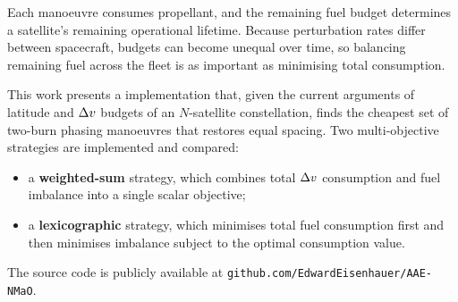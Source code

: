 Each manoeuvre consumes propellant, and the remaining fuel budget
determines a satellite's remaining operational lifetime. Because
perturbation rates differ between spacecraft, budgets can become
unequal over time, so balancing remaining fuel across the fleet is
as important as minimising total consumption.

This work presents a \MATLAB{} implementation that, given the current
arguments of latitude and $\Delta v$ budgets of an $N$-satellite constellation,
finds the cheapest set of two-burn phasing manoeuvres that restores equal
spacing. Two multi-objective strategies are implemented and compared:
\begin{itemize}
  \item a \textbf{weighted-sum} strategy, which combines total $\Delta v$
        consumption and fuel imbalance into a single scalar objective;
  \item a \textbf{lexicographic} strategy, which minimises total fuel
        consumption first and then minimises imbalance subject to the
        optimal consumption value.
\end{itemize}

The source code is publicly available at
\texttt{github.com/EdwardEisenhauer/AAE-NMaO}.
